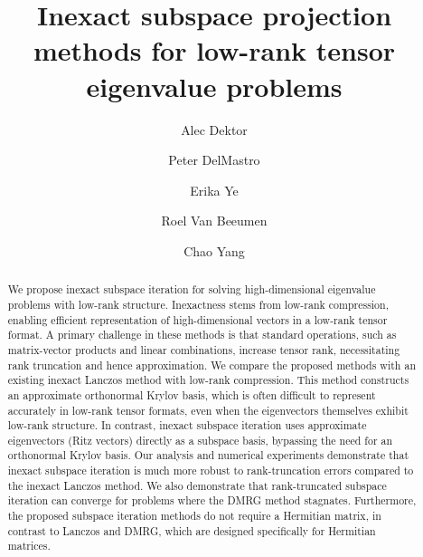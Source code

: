 \documentclass[10pt,preprint]{elsarticle}
\title{Inexact subspace projection methods for low-rank tensor eigenvalue problems}
\begin{document}
\begin{frontmatter}

\author[lbnl]{Alec Dektor}

\author[vt]{Peter DelMastro}

\author[lbnl]{Erika Ye}
\author[lbnl]{Roel Van Beeumen}
\author[lbnl]{Chao Yang}


\address[lbnl]{Applied Mathematics and Computational Research Division,
  Lawrence Berkeley National Laboratory, Berkeley, CA}

\address[vt]{Department of Mathematics, Virginia Tech, Blacksburg, VA}


\date{}

\begin{abstract}
We propose inexact subspace iteration for solving high-dimensional eigenvalue problems with low-rank structure. Inexactness stems from low-rank compression, enabling efficient representation of high-dimensional vectors in a low-rank tensor format. A primary challenge in these methods is that standard operations, such as matrix-vector products and linear combinations, increase tensor rank, necessitating rank truncation and hence approximation. We compare the proposed methods with an existing inexact Lanczos method with low-rank compression. This method constructs an approximate orthonormal Krylov basis, which is often difficult to represent accurately in low-rank tensor formats, even when the eigenvectors themselves exhibit low-rank structure. In contrast, inexact subspace iteration uses approximate eigenvectors (Ritz vectors) directly as a subspace basis, bypassing the need for an orthonormal Krylov basis. Our analysis and numerical experiments demonstrate that inexact subspace iteration is much more robust to rank-truncation errors compared to the inexact Lanczos method. We also demonstrate that rank-truncated subspace iteration can converge for problems where the DMRG method stagnates. Furthermore, the proposed subspace iteration methods do not require a Hermitian matrix, in contrast to Lanczos and DMRG, which are designed specifically for Hermitian matrices.
\end{abstract}




\end{frontmatter}
\end{document}
